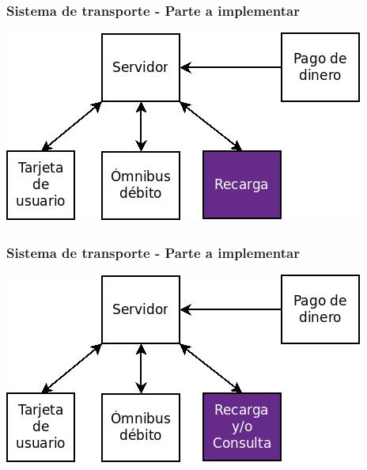 \documentclass{beamer}
\begin{document}
\begin{frame}
	\frametitle{Sistema de transporte - Parte a implementar}
	\begin{center}
		\includegraphics[scale=.5]{Imagenes/sistrans1.jpg}
	\end{center}
\end{frame}

\begin{frame}
	\frametitle{Sistema de transporte - Parte a implementar}
	\begin{center}
		\includegraphics[scale=.5]{Imagenes/sistrans2.jpg}
	\end{center}
\end{frame}	
\end{document}
